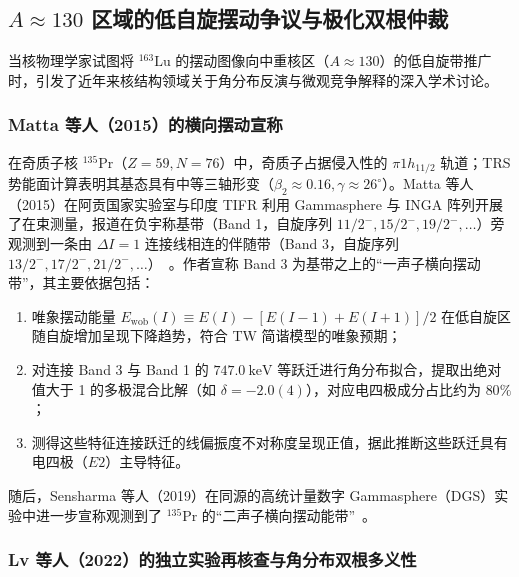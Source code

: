 \subsection{$A\approx 130$ 区域的低自旋摆动争议与极化双根仲裁}\label{sec:4-4-3}

当核物理学家试图将 $^{163}\mathrm{Lu}$ 的摆动图像向中重核区（$A\approx 130$）的低自旋带推广时，引发了近年来核结构领域关于角分布反演与微观竞争解释的深入学术讨论。

\subsubsection{Matta 等人（2015）的横向摆动宣称}

在奇质子核 $^{135}\mathrm{Pr}$（$Z=59, N=76$）中，奇质子占据侵入性的 $\pi 1h_{11/2}$ 轨道；TRS 势能面计算表明其基态具有中等三轴形变（$\beta_2 \approx 0.16, \gamma \approx 26^\circ$）。Matta 等人（2015）在阿贡国家实验室与印度 TIFR 利用 Gammasphere 与 INGA 阵列开展了在束测量，报道在负宇称基带（Band 1，自旋序列 $11/2^-, 15/2^-, 19/2^-, \dots$）旁观测到一条由 $\Delta I = 1$ 连接线相连的伴随带（Band 3，自旋序列 $13/2^-, 17/2^-, 21/2^-, \dots$）~\cite{matta-2015-transverse-wobbling-135pr}。作者宣称 Band 3 为基带之上的“一声子横向摆动带”，其主要依据包括：
\begin{enumerate}
\item 唯象摆动能量 $E_{\text{wob}}(I) \equiv E(I) - [E(I-1) + E(I+1)]/2$ 在低自旋区随自旋增加呈现下降趋势，符合 TW 简谐模型的唯象预期；
\item 对连接 Band 3 与 Band 1 的 $747.0\ \mathrm{keV}$ 等跃迁进行角分布拟合，提取出绝对值大于 1 的多极混合比解（如 $\delta = -2.0(4)$），对应电四极成分占比约为 $80\%$；
\item 测得这些特征连接跃迁的线偏振度不对称度呈现正值，据此推断这些跃迁具有电四极（$E2$）主导特征。
\end{enumerate}
随后，Sensharma 等人（2019）在同源的高统计量数字 Gammasphere（DGS）实验中进一步宣称观测到了 $^{135}\mathrm{Pr}$ 的“二声子横向摆动能带”~\cite{sensharma-2019-two-phonon-wobbling-135pr}。

\subsubsection{Lv 等人（2022）的独立实验再核查与角分布双根多义性}

